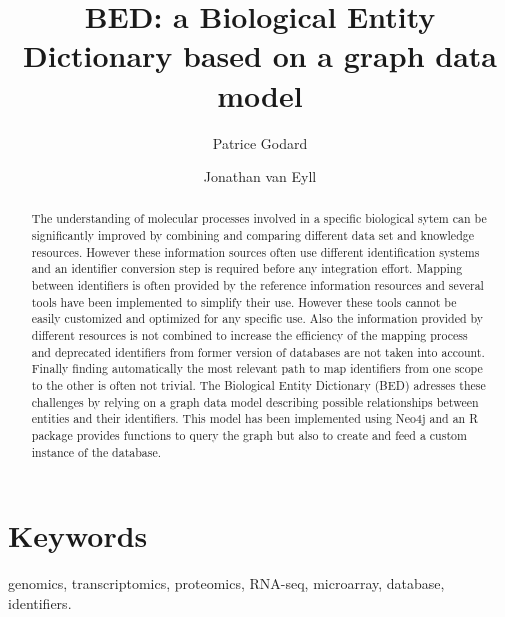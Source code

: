 \documentclass[9pt,a4paper,]{extarticle}
\theoremstyle{definition}
\theoremstyle{definition}
\theoremstyle{definition}
\theoremstyle{remark}
\begin{document}
\pagestyle{front}

\title{BED: a Biological Entity Dictionary based on a graph data model}

\author[1]{Patrice Godard}
\author[2]{Jonathan van Eyll}

\maketitle
\thispagestyle{front}

\begin{abstract}
The understanding of molecular processes involved in a specific biological sytem can be significantly improved by combining and comparing different data set and knowledge resources. However these information sources often use different identification systems and an identifier conversion step is required before any integration effort. Mapping between identifiers is often provided by the reference information resources and several tools have been implemented to simplify their use. However these tools cannot be easily customized and optimized for any specific use. Also the information provided by different resources is not combined to increase the efficiency of the mapping process and deprecated identifiers from former version of databases are not taken into account. Finally finding automatically the most relevant path to map identifiers from one scope to the other is often not trivial. The Biological Entity Dictionary (BED) adresses these challenges by relying on a graph data model describing possible relationships between entities and their identifiers. This model has been implemented using Neo4j and an R package provides functions to query the graph but also to create and feed a custom instance of the database.
\end{abstract}

\section*{Keywords}
genomics, transcriptomics, proteomics, RNA-seq, microarray, database, identifiers.


\clearpage
\pagestyle{main}

\newcommand{\tm}{\textsuperscript{\textregistered}}
\newcommand{\neo}{Neo4j\tm{}}
\newcommand{\cypher}{Cypher\tm{}}
\newcommand{\docker}{Docker\tm{}}
\newcommand{\metabase}{MetaBase\tm{}}
\end{document}
